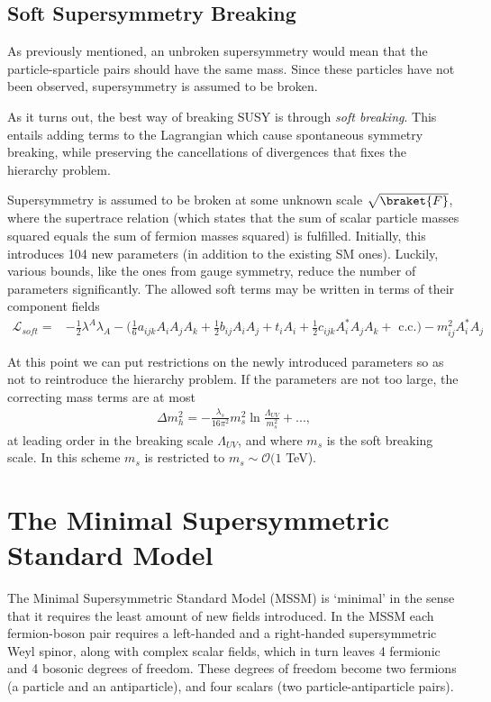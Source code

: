 \documentclass[twoside,english]{uiofysmaster}
\begin{document}
\subsection{Soft Supersymmetry Breaking}

As previously mentioned, an unbroken supersymmetry would mean that the particle-sparticle pairs should have the same mass. Since these particles have not been observed, supersymmetry is assumed to be broken.

As it turns out, the best way of breaking SUSY is through \textit{soft breaking}. This entails adding terms to the Lagrangian which cause spontaneous symmetry breaking, while preserving the cancellations of divergences that fixes the hierarchy problem.

Supersymmetry is assumed to be broken at some unknown scale $\sqrt{\braket{F}}$, where the supertrace relation (which states that the sum of scalar particle masses squared equals the sum of fermion masses squared) is fulfilled. Initially, this introduces 104 new parameters (in addition to the existing SM ones). Luckily, various bounds, like the ones from gauge symmetry, reduce the number of parameters significantly. The allowed soft terms may be written in terms of their component fields
\begin{align}
\mathcal{L}_{soft} =& - \frac{1}{2} \lambda^A \lambda_A - \Big(\frac{1}{6} a_{ijk} A_i A_j A_k + \frac{1}{2} b_{ij} A_i A_j + t_i A_i + \frac{1}{2} c_{ijk} A^{*}_i A_jA_k + \text{ c.c.} \Big) - m_{ij}^2 A_i^*A_j
\end{align}

At this point we can put restrictions on the newly introduced parameters so as not to reintroduce the hierarchy problem. If the parameters are not too large, the correcting mass terms are at most
\begin{align*}
\Delta m_h^2 = - \frac{\lambda_s}{16 \pi^2} m_s^2\ln \frac{\Lambda_{UV}}{m_s^2} +...,
\end{align*}
at leading order in the breaking scale $\Lambda_{UV}$, and where $m_s$ is the soft breaking scale. In this scheme $m_s$ is restricted to $m_s \sim \mathcal{O}(1$ TeV).

\section{The Minimal Supersymmetric Standard Model}

The Minimal Supersymmetric Standard Model (MSSM) is `minimal' in the sense that it requires the least amount of new fields introduced. In the MSSM each fermion-boson pair requires a left-handed and a right-handed supersymmetric Weyl spinor, along with complex scalar fields, which in turn leaves 4 fermionic and 4 bosonic degrees of freedom. These degrees of freedom become two fermions (a particle and an antiparticle), and four scalars (two particle-antiparticle pairs). 
\end{document}
